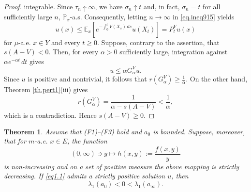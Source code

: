 \documentclass[11pt,a4paper,reqno]{amsart}
\newtheorem{theorem}{\bf Theorem}[section]
\theoremstyle{definition}
\numberwithin{equation}{section}
\begin{document}
\begin{proof}
integrable.
Since $\tau_n\uparrow\infty$, we have $\sigma_n\uparrow t$ and, in
fact, $\sigma_n=t$ for all sufficiently large $n$, $\mathbb P_x$-a.s.
Consequently, letting $n\to\infty$ in \eqref{eq.ineq915} yields
\begin{equation*}
u(x)\le\mathbb E_x\left[e^{-\int_0^tV(X_s)\,ds}u(X_t)\right]=P_t^Vu(x)
\end{equation*}
for $\mu$-a.e. $x\in Y$ and every $t\ge0$.
Suppose, contrary to the assertion, that $s(A-V)<0$. Then, for every
$\alpha>0$ sufficiently large, integration against
$\alpha e^{-\alpha t}\,dt$ gives
\begin{equation*}
u\le\alpha G_\alpha^Vu.
\end{equation*}
Since $u$ is positive and nontrivial, it follows that $r(G_\alpha^V)\ge\frac{1}{\alpha}$.
On the other hand, Theorem \ref{th.pert1}(iii) gives
\begin{equation*}
r(G_\alpha^V)=\frac{1}{\alpha-s(A-V)}<\frac{1}{\alpha},
\end{equation*}
which is a contradiction. Hence $s(A-V)\ge0$.
\end{proof}


\begin{theorem}
\label{th.necessary}
Assume that \textup{(F1)--(F3)} hold and $a_0$ is bounded.
Suppose, moreover, that for $m$-a.e. $x\in E$, the function
\[
(0,\infty)\ni y\longmapsto h(x,y):=\frac{f(x,y)}{y}
\]
is non-increasing and on a set of positive measure the above mapping is strictly decreasing. 
If \eqref{eq1.1} admits a strictly positive
solution $u$, then
\[
\lambda_1(a_0)<0<\lambda_1(a_\infty).
\]
\end{theorem}
\end{document}
